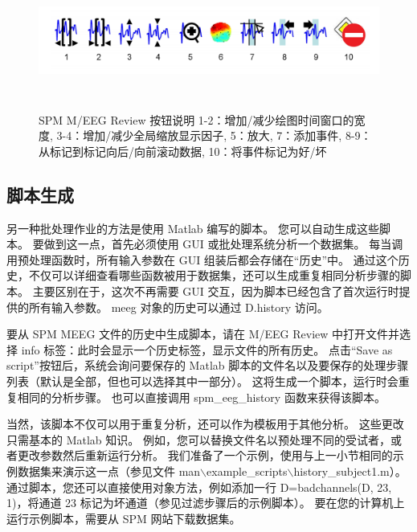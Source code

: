 	\begin{figure}
		\centering 
		\includegraphics[height=4.5cm,width=15cm]{12.1}
		\caption{SPM M/EEG Review 按钮说明 1-2：增加/减少绘图时间窗口的宽度,
			3-4：增加/减少全局缩放显示因子,
			5：放大,
			7：添加事件,
			8-9：从标记到标记向后/向前滚动数据,
			10：将事件标记为好/坏} \label{fig:12.1}
	\end{figure}



\subsection{脚本生成}

另一种批处理作业的方法是使用 Matlab 编写的脚本。
您可以自动生成这些脚本。
要做到这一点，首先必须使用 GUI 或批处理系统分析一个数据集。
每当调用预处理函数时，所有输入参数在 GUI 组装后都会存储在“历史”中。
通过这个历史，不仅可以详细查看哪些函数被用于数据集，还可以生成重复相同分析步骤的脚本。
主要区别在于，这次不再需要 GUI 交互，因为脚本已经包含了首次运行时提供的所有输入参数。
meeg 对象的历史可以通过 D.history 访问。

要从 SPM MEEG 文件的历史中生成脚本，请在 M/EEG Review 中打开文件并选择 info 标签：此时会显示一个历史标签，显示文件的所有历史。
点击“Save as script”按钮后，系统会询问要保存的 Matlab 脚本的文件名以及要保存的处理步骤列表（默认是全部，但也可以选择其中一部分）。
这将生成一个脚本，运行时会重复相同的分析步骤。
也可以直接调用 spm\_eeg\_history 函数来获得该脚本。

当然，该脚本不仅可以用于重复分析，还可以作为模板用于其他分析。
这些更改只需基本的 Matlab 知识。
例如，您可以替换文件名以预处理不同的受试者，或者更改参数然后重新运行分析。
我们准备了一个示例，使用与上一小节相同的示例数据集来演示这一点（参见文件 man$\backslash$example\_scripts$\backslash$history\_subject1.m）。
通过脚本，您还可以直接使用对象方法，例如添加一行 D=badchannels(D, 23, 1)，将通道 23 标记为坏通道（参见过滤步骤后的示例脚本）。
要在您的计算机上运行示例脚本，需要从 SPM 网站下载数据集。